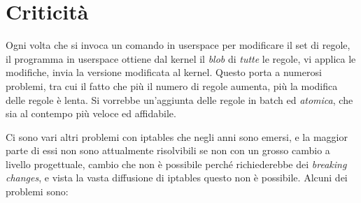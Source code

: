 \section{Criticità}
Ogni volta che si invoca un comando in userspace per modificare il set
di regole, il programma in userspace ottiene dal kernel il \textit{blob}
di \textit{tutte} le regole, vi applica le modifiche, invia la versione
modificata al kernel.
Questo porta a numerosi problemi, tra cui il fatto che più il numero di regole
aumenta, più la modifica delle regole è lenta.
Si vorrebbe un'aggiunta delle regole in batch ed \textit{atomica}, che
sia al contempo più veloce ed affidabile.

Ci sono vari altri problemi con iptables che negli anni sono emersi, e la
maggior parte di essi non sono attualmente risolvibili se non con un grosso
cambio a livello progettuale, cambio che non è possibile perché richiederebbe
dei \textit{breaking changes}, e vista la vasta diffusione di iptables questo
non è possibile.
Alcuni dei problemi sono:

